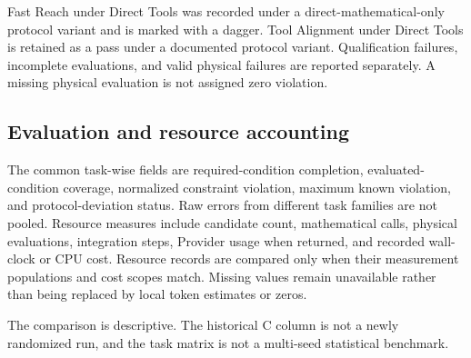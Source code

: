 Fast Reach under Direct Tools was recorded under a direct-mathematical-only protocol variant and is marked with a dagger. Tool Alignment under Direct Tools is retained as a pass under a documented protocol variant. Qualification failures, incomplete evaluations, and valid physical failures are reported separately. A missing physical evaluation is not assigned zero violation.

\subsection{Evaluation and resource accounting}

The common task-wise fields are required-condition completion, evaluated-condition coverage, normalized constraint violation, maximum known violation, and protocol-deviation status. Raw errors from different task families are not pooled. Resource measures include candidate count, mathematical calls, physical evaluations, integration steps, Provider usage when returned, and recorded wall-clock or CPU cost. Resource records are compared only when their measurement populations and cost scopes match. Missing values remain unavailable rather than being replaced by local token estimates or zeros.

The comparison is descriptive. The historical C column is not a newly randomized run, and the task matrix is not a multi-seed statistical benchmark.
